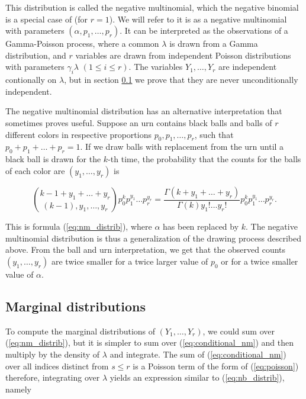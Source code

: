 \documentclass[12pt]{article}
\begin{document}
    This distribution is called the negative multinomial, which
    the negative binomial is a special case of (for $r=1$). We will
    refer to it is as a negative multinomial with parameters
    $(\alpha, p_1, \ldots, p_r)$. It can be interpreted as the
    observations of a Gamma-Poisson process, where a common $\lambda$
    is drawn from a Gamma distribution, and $r$ variables are drawn
    from independent Poisson distributions with parameters
    $\gamma_i \lambda$ $(1 \leq i \leq r)$. The variables
    $Y_1, \ldots, Y_r$ are independent contionally on $\lambda$,
    but in section \ref{sec:marginal_nm} we prove
    that they are never unconditionally independent.

    The negative multinomial distribution has an alternative
    interpretation that sometimes proves useful. Suppose an urn
    contains black balls and balls of $r$ different
    colors in respective proportions $p_0, p_1, \ldots, p_r$, such
    that $p_0 + p_1 + \ldots + p_r =1$. If we draw balls with
    replacement from the urn until a black ball is drawn for the
    $k$-th time, the probability that the counts for the balls of
    each color are $(y_1, \ldots, y_r)$ is

    \begin{equation*}
    {k-1+y_1+\ldots+y_r \choose (k-1), y_1, \ldots, y_r}
      p_0^k p_1^{y_1} \ldots p_r^{y_r} =
    \frac{\Gamma(k+y_1+\ldots+y_r)}{\Gamma(k)y_1! \ldots y_r!}
      p_0^k p_1^{y_1} \ldots p_r^{y_r}.
    \end{equation*}

    This is formula (\ref{eq:nm_distrib}), where $\alpha$ has
    been replaced by $k$. The negative multinomial distribution is
    thus a generalization of the drawing process described above.
    From the ball and urn interpretation, we get that the observed
    counts $(y_1, \ldots, y_r)$ are twice smaller for a twice larger
    value of $p_0$ or for a twice smaller value of $\alpha$.

\subsection{Marginal distributions}
\label{sec:marginal_nm}

    To compute the marginal distributions of
    $(Y_1, \ldots, Y_r)$, we could sum over (\ref{eq:nm_distrib}),
    but it is simpler to sum over (\ref{eq:conditional_nm}) and then
    multiply by the density of $\lambda$ and integrate. The sum of
    (\ref{eq:conditional_nm}) over all indices distinct from
    $s \leq r$ is a Poisson term of the form of (\ref{eq:poisson})
    therefore, integrating over $\lambda$ yields an expression
    similar to (\ref{eq:nb_distrib}), namely
\end{document}

